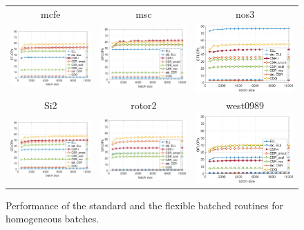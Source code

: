 \begin{figure}[thb!]
\begin{center}
\begin{tabular}{ccc}
\\
\hline
{\sc mcfe} & {\sc msc} & {\sc nos3}\\
\includegraphics[width=.30\columnwidth]{plots/single_matrices/GFLOPS/mcfe_GFLOPs}
&
\includegraphics[width=.30\columnwidth]{plots/single_matrices/GFLOPS/msc00726_GFLOPs}
&
\includegraphics[width=.30\columnwidth]{plots/single_matrices/GFLOPS/nos3_GFLOPs}
\\
\hline
{\sc Si2} & {\sc rotor2} & {\sc west0989}\\
\includegraphics[width=.30\columnwidth]{plots/single_matrices/GFLOPS/Si2_GFLOPs}
&
\includegraphics[width=.30\columnwidth]{plots/single_matrices/GFLOPS/rotor2_GFLOPs}
&
\includegraphics[width=.30\columnwidth]{plots/single_matrices/GFLOPS/west0989_GFLOPs}

\end{tabular}
\end{center}
\caption{Performance of the standard and the flexible batched \spmv routines 
for homogeneous batches.}
\label{2017-batched-spmv:fig:selectperf}
\end{figure}



